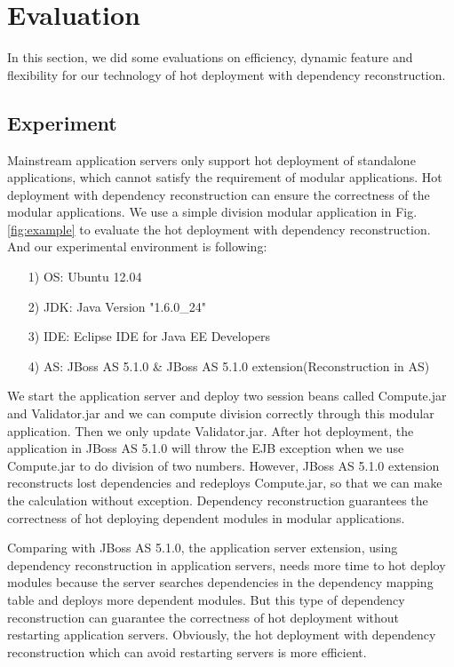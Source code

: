 \documentclass[conference]{IEEEtran}
\begin{document}


\section{Evaluation\label{sec:evaluation}}
In this section, we did some evaluations on efficiency, dynamic feature and flexibility for our technology of hot deployment with dependency reconstruction.

\subsection{Experiment}
Mainstream application servers only support hot deployment of standalone applications, which cannot satisfy the requirement of modular applications.
Hot deployment with dependency reconstruction can ensure the correctness of the modular applications.
We use a simple division modular application in Fig. \ref{fig:example} to evaluate the hot deployment with dependency reconstruction.
And our experimental environment is following:
\begin{itemize}[]
\item[1)] OS: Ubuntu 12.04
\item[2)] JDK: Java Version "1.6.0\_24"
\item[3)] IDE: Eclipse IDE for Java EE Developers
\item[4)] AS: JBoss AS 5.1.0 \& JBoss AS 5.1.0 extension(Reconstruction in AS)
\end{itemize}

We start the application server and deploy two session beans called Compute.jar and Validator.jar and we can compute division correctly through this modular application.
Then we only update Validator.jar.
After hot deployment, the application in JBoss AS 5.1.0 will throw the EJB exception when we use Compute.jar to do division of two numbers.
However, JBoss AS 5.1.0 extension reconstructs lost dependencies and redeploys Compute.jar, so that we can make the calculation without exception.
Dependency reconstruction guarantees the correctness of hot deploying dependent modules in modular applications.

Comparing with JBoss AS 5.1.0, the application server extension, using dependency reconstruction in application servers, needs more time to hot deploy modules because the server searches dependencies in the dependency mapping table and deploys more dependent modules.
But this type of dependency reconstruction can guarantee the correctness of hot deployment without restarting application servers.
Obviously, the hot deployment with dependency reconstruction which can avoid restarting servers is more efficient.
\end{document}
